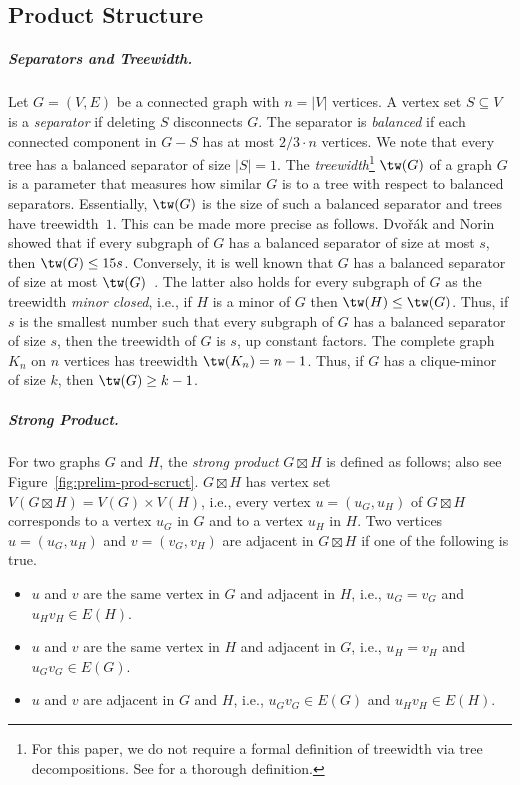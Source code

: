 \subsection{Product Structure}
%
\subparagraph{Separators and Treewidth.}
%
Let $G = (V, E)$ be a connected graph with $n = |V|$ vertices.
A vertex set $S \subseteq V$ is a \emph{separator} if deleting $S$ disconnects $G$.
The separator is \emph{balanced} if each connected component in $G - S$ has at most $2/3 \cdot n$ vertices.
We note that every tree has a balanced separator of size $|S| = 1$.
The \emph{treewidth}\footnote{For this paper, we do not require a formal definition of treewidth via tree decompositions. See \cite[Section~7]{cygan_treewidth_2015} for a thorough definition.} $\tw(G)$ of a graph $G$ is a parameter that measures how similar $G$ is to a tree with respect to balanced separators.
Essentially, $\tw(G)$ is the size of such a balanced separator and trees have treewidth~$1$.
This can be made more precise as follows.
Dvořák and Norin~\cite{Treew_Graph_Balan_Separ-DvoraNorin19} showed that if every subgraph of $G$ has a balanced separator of size at most $s$, then $\tw(G) \le 15s$.
Conversely, it is well known that $G$ has a balanced separator of size at most $\tw(G)$~\cite[Lemma~7.20]{cygan_treewidth_2015}.
The latter also holds for every subgraph of $G$ as the treewidth \emph{minor closed}, i.e., if $H$ is a minor of $G$ then $\tw(H) \le \tw(G)$.
Thus, if $s$ is the smallest number such that every subgraph of $G$ has a balanced separator of size $s$, then the treewidth of $G$ is $s$, up constant factors.
%
The complete graph $K_n$ on $n$ vertices has treewidth $\tw(K_n) = n - 1$.
Thus, if $G$ has a clique-minor of size $k$, then $\tw(G) \ge k - 1$.
%
\subparagraph{Strong Product.}
%
For two graphs $G$ and $H$, the \emph{strong product} $G \boxtimes H$ is defined as follows; also see Figure~\ref{fig:prelim-prod-scruct}.
$ G \boxtimes H $ has vertex set $V(G \boxtimes H) = V(G) \times V(H)$, i.e., every vertex $u = (u_G, u_H)$ of $G \boxtimes H$ corresponds to a vertex $u_G$ in $G$ and to a vertex $u_H$ in $H$.
Two vertices $u = (u_G, u_H)$ and $v = (v_G, v_H)$ are adjacent in $G \boxtimes H$ if one of the following is true.
%
\begin{itemize}
  \item $u$ and $v$ are the same vertex in $G$ and adjacent in $H$, i.e., $u_G = v_G$ and $u_Hv_H \in E(H)$.
  \item $u$ and $v$ are the same vertex in $H$ and adjacent in $G$, i.e., $u_H = v_H$ and $u_Gv_G \in E(G)$.
  \item $u$ and $v$ are adjacent in $G$ and $H$, i.e., $u_Gv_G \in E(G)$ and $u_Hv_H \in E(H)$.
\end{itemize}
